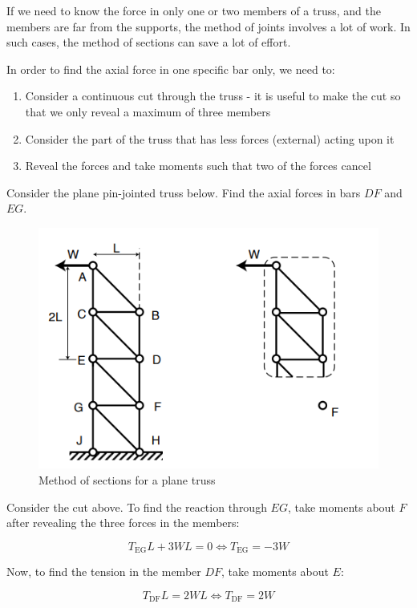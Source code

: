 \documentclass{article}
\begin{document}
If we need to know the force in only one or two members of a truss, and the members are far from the supports, the method of joints involves a lot of work. In such cases, the method of sections can save a lot of effort.

In order to find the axial force in one specific bar only, we need to:

\begin{enumerate}
    \item Consider a continuous cut through the truss - it is useful to make the cut so that we only reveal a maximum of three members
    \item Consider the part of the truss that has less forces (external) acting upon it
    \item Reveal the forces and take moments such that two of the forces cancel
\end{enumerate}

\begin{example}
    Consider the plane pin-jointed truss below. Find the axial forces in bars $DF$ and $EG$.

    \begin{figure}[h]
    \centering
    \includegraphics{images/truss3.png}
    \caption{Method of sections for a plane truss}
    \label{fig:enter-label}
    \end{figure}

    Consider the cut above. To find the reaction through $EG$, take moments about $F$ after revealing the three forces in the members:

    \[ T_{\text{EG}}L + 3WL = 0 \iff T_{\text{EG}} = -3W \]

    Now, to find the tension in the member $DF$, take moments about $E$:

    \[ T_{\text{DF}}L = 2WL \iff T_{\text{DF}} = 2W \]
\end{example}
\end{document}
